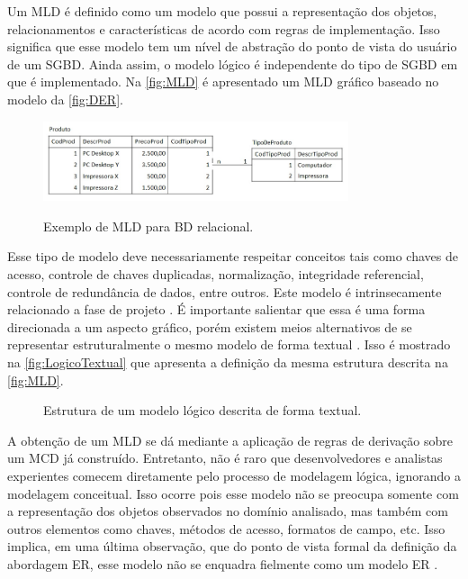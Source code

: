 Um \ac{MLD} é definido como um modelo que possui a representação dos objetos, relacionamentos e características de acordo com regras de implementação. 
Isso significa que esse modelo tem um nível de abstração do ponto de vista do usuário de um \ac{SGBD}. 
Ainda assim, o modelo lógico é independente do tipo de \ac{SGBD} em que é implementado. 
Na \autoref{fig:MLD} é apresentado um \ac{MLD} gráfico baseado no modelo da \autoref{fig:DER}.

\begin{figure}[htb]
	\centering
	\caption{Exemplo de MLD para BD relacional.}
		\includegraphics[width=0.8\textwidth]{img/MLD.jpg}
	\label{fig:MLD}
\end{figure}

Esse tipo de modelo deve necessariamente respeitar conceitos tais como chaves de acesso, controle de chaves duplicadas, normalização, integridade referencial, controle de redundância de dados, entre outros. 
Este modelo é intrinsecamente relacionado a fase de projeto \cite{Cougo:2013}. 
É importante salientar que essa é uma forma direcionada a um aspecto gráfico, porém existem meios alternativos de se representar estruturalmente o mesmo modelo de forma textual \cite{Martelli:2018}. 
Isso é mostrado na \autoref{fig:LogicoTextual} que apresenta a definição da mesma estrutura descrita na \autoref{fig:MLD}.

\begin{figure}[!htb]
    \caption{Estrutura de um modelo lógico descrita de forma textual.}
    \label{fig:LogicoTextual}
    \centering
\end{figure}

A obtenção de um \ac{MLD} se dá mediante a aplicação de regras de derivação sobre um \ac{MCD} já construído. 
Entretanto, não é raro que desenvolvedores e analistas experientes comecem diretamente pelo processo de modelagem lógica, ignorando a modelagem conceitual. 
Isso ocorre pois esse modelo não se preocupa somente com a representação dos objetos observados no domínio analisado, mas também com outros elementos como chaves, métodos de acesso, formatos de campo, etc. 
Isso implica, em uma última observação, que do ponto de vista formal da definição da abordagem \ac{ER}, esse modelo não se enquadra fielmente como um modelo \ac{ER} \cite{West:2011}.

